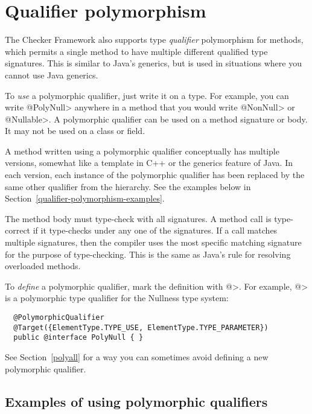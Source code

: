 \section{Qualifier polymorphism\label{qualifier-polymorphism}}

The Checker Framework also supports type \emph{qualifier} polymorphism for
methods, which permits a single method to have multiple different qualified
type signatures.  This is similar to Java's generics, but is used in
situations where you cannot use Java generics.

To \emph{use} a polymorphic qualifier, just write it on a type.
For example, you can write \<@PolyNull> anywhere in a method that you would write
\<@NonNull> or \<@Nullable>.
A polymorphic qualifier can be used on a method signature or body.
It may not be used on a class or field.

A method written using a polymorphic qualifier conceptually has multiple
versions, somewhat like a template in C++ or the generics feature of Java.
In each version, each instance of the polymorphic qualifier has been
replaced by the same other qualifier from the hierarchy.  See the examples
below in Section~\ref{qualifier-polymorphism-examples}.

The method body must type-check with all signatures.  A method call is
type-correct if it type-checks under any one of the signatures.  If a call
matches multiple signatures, then the compiler uses the most specific
matching signature for the purpose of type-checking.  This is the same as
Java's rule for resolving overloaded methods.

To \emph{define} a polymorphic qualifier, mark the definition with
\<@>.  For example,
\<@> is a polymorphic type
qualifier for the Nullness type system:

\begin{Verbatim}
  @PolymorphicQualifier
  @Target({ElementType.TYPE_USE, ElementType.TYPE_PARAMETER})
  public @interface PolyNull { }
\end{Verbatim}

\noindent
See Section~\ref{polyall} for a way you can sometimes avoid defining a new
polymorphic qualifier.


\subsection{Examples of using polymorphic qualifiers\label{qualifier-polymorphism-examples}}

